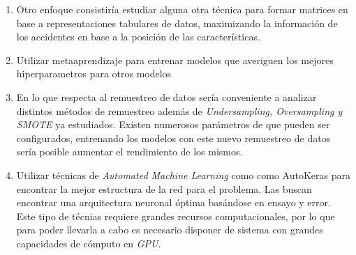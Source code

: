 \begin{enumerate}
		\item Otro enfoque consistiría estudiar alguna otra técnica para formar matrices en base a representaciones tabulares de datos, maximizando la información de los accidentes en base a la posición de las características.

		\item Utilizar metaaprendizaje para entrenar modelos que averiguen los mejores hiperparametros para otros modelos

		\item En lo que respecta al remuestreo de datos sería conveniente a analizar distintos métodos de remuestreo además de \textit{Undersampling, Oversampling y SMOTE} ya estudiados. Existen numerosos parámetros de  que pueden ser configurados, entrenando los modelos con este nuevo remuestreo de datos sería posible aumentar el rendimiento de los mismos.

		\item Utilizar técnicas de \textit{Automated Machine Learning} como  como AutoKeras \cite{AutoKeras} para encontrar la mejor estructura de la red para el problema. Las  buscan encontrar una arquitectura neuronal óptima basándose en ensayo y error. Este tipo de técnias requiere grandes recursos computacionales, por lo que para poder llevarla a cabo es necesario disponer de sistema con grandes capacidades de cómputo en \textit{GPU}.

	\end{enumerate}